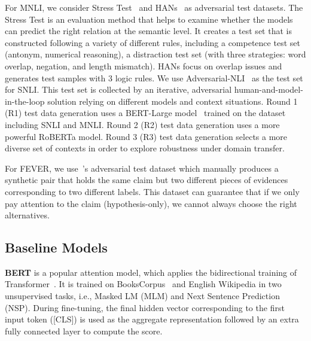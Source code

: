 For MNLI, we consider Stress Test~\cite{naik2018stress} 
and HANs~\cite{mccoy2019right} as adversarial 
test datasets. The Stress Test is an evaluation method that helps to examine whether the
models can predict the right relation at the semantic level. 
It creates a test
set that is constructed following a variety of different rules,
including a competence test set (antonym, numerical reasoning),
a distraction test set (with three strategies: word overlap,
negation, and length mismatch). 
HANs focus on overlap issues and 
generates test samples with 3 logic rules. 
We use Adversarial-NLI~\cite{nie2019adversarial} as the test set for SNLI. 
This test set is collected by an iterative, adversarial human-and-model-in-the-loop 
solution relying on different models and context situations. 
Round 1 (R1) test data generation uses a BERT-Large model~\cite{devlin2018bert} 
trained on the dataset including SNLI and MNLI.
Round 2 (R2) test data generation uses a more powerful RoBERTa model. 
Round 3 (R3) test data generation selects a more diverse set of contexts
in order to explore robustness under domain transfer. 

For FEVER, we use~\cite{schuster2019towards}'s 
adversarial test dataset which manually produces a synthetic pair that 
holds the same claim but 
two different pieces of evidences corresponding to two different labels.
This dataset can guarantee that if we only pay attention to the claim (hypothesis-only), we 
cannot always choose the right alternatives.

\subsection{Baseline Models}
\textbf{BERT} is a popular attention model, which applies the bidirectional training of Transformer~\cite{vaswani2017attention}. 
It is trained on BooksCorpus~\cite{zhu2015aligning} and English Wikipedia in two unsupervised
tasks, i.e., Masked LM (MLM) and Next Sentence Prediction (NSP). During fine-tuning, the final
hidden vector corresponding to the first input token ([CLS]) is used as the aggregate representation
followed by an extra fully connected layer to compute the score.


